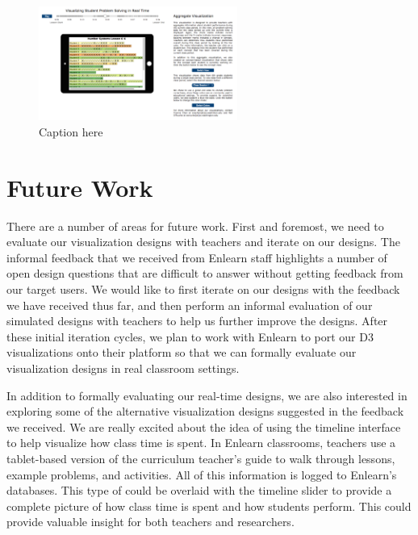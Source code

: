 \documentclass{sigchi}
\begin{document}


\begin{figure}[t]
\centering
\includegraphics[width=65mm]{images/results1.pdf}
\caption{Caption here}
\label{fig:Website}
\end{figure}

\section{Future Work}

There are a number of areas for future work. First and foremost, we need to evaluate our visualization designs with teachers and iterate on our designs. The informal feedback that we received from Enlearn staff highlights a number of open design questions that are difficult to answer without getting feedback from our target users. We would like to first iterate on our designs with the feedback we have received thus far, and then perform an informal evaluation of our simulated designs with teachers to help us further improve the designs. After these initial iteration cycles, we plan to work with Enlearn to port our D3 visualizations onto their platform so that we can formally evaluate our visualization designs in real classroom settings.

In addition to formally evaluating our real-time designs, we are also interested in exploring some of the alternative visualization designs suggested in the feedback we received. We are really excited about the idea of using the timeline interface to help visualize how class time is spent. In Enlearn classrooms, teachers use a tablet-based version of the curriculum teacher's guide to walk through lessons, example problems, and activities. All of this information is logged to Enlearn's databases. This type of could be overlaid with the timeline slider to provide a complete picture of how class time is spent and how students perform. This could provide valuable insight for both teachers and researchers.
\end{document}
